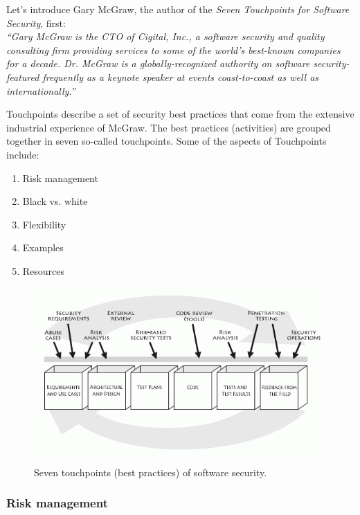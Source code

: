 \documentclass[12pt,a4,twoside]{article}
\begin{document}
Let's introduce Gary McGraw, the author of the \textit{Seven Touchpoints for Software Security}, first:\\

\textit{``Gary McGraw is the CTO of \textit{Cigital, Inc.}, a software security and quality consulting firm providing services to some of the world's best-known companies for a decade. Dr. McGraw is a globally-recognized authority on software security-featured frequently as a keynote speaker at events coast-to-coast as well as internationally.''} \cite{mcgraw_software_security}

Touchpoints describe a set of security best practices that come from the extensive industrial experience of McGraw. The best practices (activities) are grouped together in seven so-called touchpoints. Some of the aspects of Touchpoints include:

\begin{enumerate}
    \item Risk management
    \item Black vs. white
    \item Flexibility
    \item Examples
    \item Resources
\end{enumerate}

\begin{figure}[h]
\centering
\includegraphics[width=1\textwidth]{figures/touchpoints.png}
\caption{Seven touchpoints (best practices) of software security. \cite{mcgraw_software_security}}
\label{fig:touchpoints}
\end{figure}

\subsubsection{Risk management}
\end{document}
